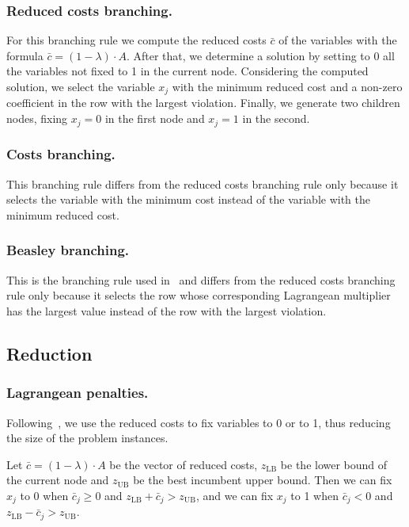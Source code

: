 \documentclass[runningheads]{llncs}
\begin{document}
\subsubsection{Reduced costs branching.} For this branching rule we compute the reduced costs $\bar{c}$ of the variables with the formula $\bar{c} = (1 - \lambda) \cdot A$. After that, we determine a solution by setting to 0 all the variables not fixed to 1 in the current node. Considering the computed solution, we select the variable $x_j$ with the minimum reduced cost and a non-zero coefficient in the row with the largest violation. Finally, we generate two children nodes, fixing $x_j = 0$ in the first node and $x_j = 1$ in the second.

\subsubsection{Costs branching.} This branching rule differs from the reduced costs branching rule only because it selects the variable with the minimum cost instead of the variable with the minimum reduced cost.

\subsubsection{Beasley branching.} This is the branching rule used in~\cite{beasley-1987-algorithm} and differs from the reduced costs branching rule only because it selects the row whose corresponding Lagrangean multiplier has the largest value instead of the row with the largest violation.

\subsection{Reduction}
\label{subsec:branch-bound:reduction}

\subsubsection{Lagrangean penalties.} Following~\cite{beasley-1987-algorithm}, we use the reduced costs to fix variables to 0 or to 1, thus reducing the size of the problem instances. 

Let $\bar{c} = (1 - \lambda) \cdot A$ be the vector of reduced costs, $z_{\text{LB}}$ be the lower bound of the current node and $z_{\text{UB}}$ be the best incumbent upper bound. Then we can fix $x_j$ to 0 when $\bar{c}_j \ge 0$ and $z_{\text{LB}} + \bar{c}_j > z_{\text{UB}}$, and we can fix $x_j$ to 1 when $\bar{c}_j < 0$ and $z_{\text{LB}} - \bar{c}_j > z_{\text{UB}}$.  
\end{document}
